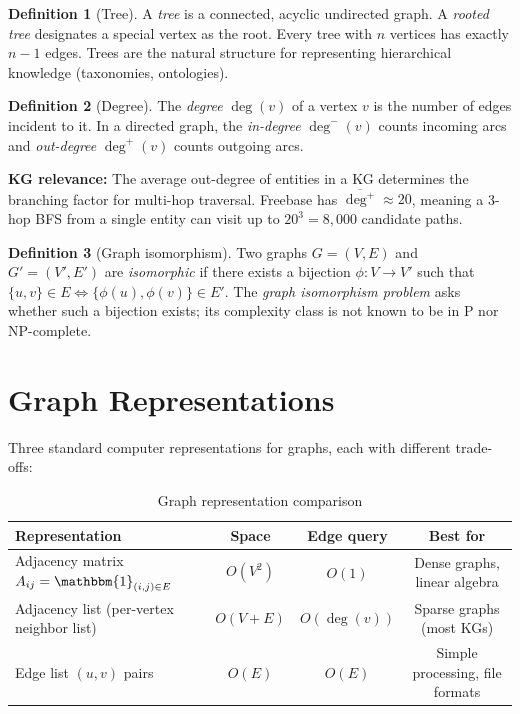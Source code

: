\documentclass[11pt,a4paper,oneside,openany]{book}
\theoremstyle{definition}
\newtheorem{definition}{Definition}[chapter]
\theoremstyle{plain}
\theoremstyle{remark}
\newcommand{\bone}{\mathbbm{1}}
\begin{document}
\begin{definition}[Tree]
	A \emph{tree} is a connected, acyclic undirected graph. A \emph{rooted tree} designates a special vertex as the root. Every tree with $n$ vertices has exactly $n-1$ edges. Trees are the natural structure for representing hierarchical knowledge (taxonomies, ontologies).
\end{definition}

\begin{definition}[Degree]
	The \emph{degree} $\deg(v)$ of a vertex $v$ is the number of edges incident to it. In a directed graph, the \emph{in-degree} $\deg^-(v)$ counts incoming arcs and \emph{out-degree} $\deg^+(v)$ counts outgoing arcs.
\end{definition}

\noindent\textbf{KG relevance:} The average out-degree of entities in a KG determines the branching factor for multi-hop traversal. Freebase has $\overline{\deg^+} \approx 20$, meaning a 3-hop BFS from a single entity can visit up to $20^3 = 8{,}000$ candidate paths.

\begin{definition}[Graph isomorphism]
	Two graphs $G = (V, E)$ and $G' = (V', E')$ are \emph{isomorphic} if there exists a bijection $\phi: V \to V'$ such that $\{u, v\} \in E \iff \{\phi(u), \phi(v)\} \in E'$. The \emph{graph isomorphism problem} asks whether such a bijection exists; its complexity class is not known to be in P nor NP-complete.
\end{definition}

\section{Graph Representations}\label{sec:graph-repr}

Three standard computer representations for graphs, each with different trade-offs:

\begin{table}[h]
	\centering
	\caption{Graph representation comparison}
	\label{tab:graph-repr}
	\begin{tabular}{lccc}
		\toprule
		Representation                                  & Space    & Edge query   & Best for                        \\
		\midrule
		Adjacency matrix $A_{ij} = \bone_{(i,j) \in E}$ & $O(V^2)$ & $O(1)$       & Dense graphs, linear algebra    \\
		Adjacency list (per-vertex neighbor list)       & $O(V+E)$ & $O(\deg(v))$ & Sparse graphs (most KGs)        \\
		Edge list $(u,v)$ pairs                         & $O(E)$   & $O(E)$       & Simple processing, file formats \\
		\bottomrule
	\end{tabular}
\end{table}
\end{document}
